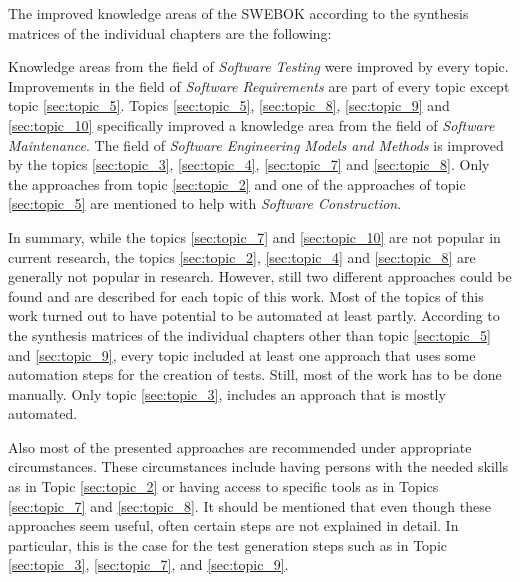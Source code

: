 The improved knowledge areas of the SWEBOK according to the synthesis matrices of the individual chapters are the following:

Knowledge areas from the field of \textit{Software Testing} were improved by every topic. Improvements in the field of \textit{Software Requirements} are part of every topic except topic \ref{sec:topic_5}. Topics \ref{sec:topic_5}, \ref{sec:topic_8}, \ref{sec:topic_9} and \ref{sec:topic_10} specifically improved a knowledge area from the field of \textit{Software Maintenance}. The field of \textit{Software Engineering Models and Methods} is improved by the topics \ref{sec:topic_3}, \ref{sec:topic_4}, \ref{sec:topic_7} and \ref{sec:topic_8}. Only the approaches from topic \ref{sec:topic_2} and one of the approaches of topic \ref{sec:topic_5} are mentioned to help with \textit{Software Construction}.

In summary, while the topics \ref{sec:topic_7} and \ref{sec:topic_10} are not popular in current research, the topics \ref{sec:topic_2}, \ref{sec:topic_4} and \ref{sec:topic_8} are generally not popular in research. However, still two different approaches could be found and are described for each topic of this work. Most of the topics of this work turned out to have potential to be automated at least partly. According to the synthesis matrices of the individual chapters other than topic \ref{sec:topic_5} and \ref{sec:topic_9}, every topic included at least one approach that uses some automation steps for the creation of tests. Still, most of the work has to be done manually. Only topic \ref{sec:topic_3},  includes an approach that is mostly automated.

Also most of the presented approaches are recommended under appropriate circumstances. These circumstances include having persons with the needed skills as in Topic \ref{sec:topic_2} or having access to specific tools as in Topics \ref{sec:topic_7} and \ref{sec:topic_8}. It should be mentioned that even though these approaches seem useful, often certain steps are not explained in detail. In particular, this is the case for the test generation steps such as in Topic \ref{sec:topic_3}, \ref{sec:topic_7}, and \ref{sec:topic_9}. 
